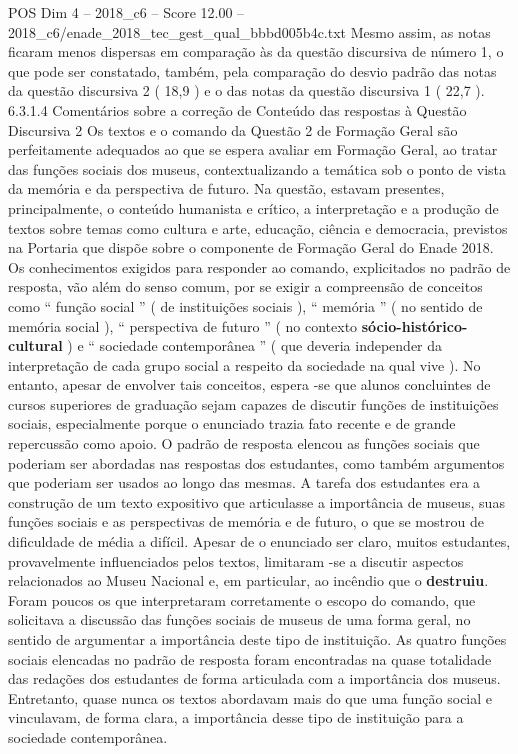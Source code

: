 \begin{textsample}{POS Dim 4 – 2018\_c6 – Score 12.00 – 2018\_c6/enade\_2018\_tec\_gest\_qual\_bbbd005b4c.txt}
Mesmo assim, as notas ficaram menos dispersas em comparação às da questão discursiva de número 1, o que pode ser constatado, também, pela comparação do desvio padrão das notas da questão discursiva 2 ( 18,9 ) e o das notas da questão discursiva 1 ( 22,7 ). 6.3.1.4 Comentários sobre a correção de Conteúdo das respostas à Questão Discursiva 2 Os textos e o comando da Questão 2 de Formação Geral são perfeitamente adequados ao que se espera avaliar em Formação Geral, ao tratar das funções sociais dos museus, contextualizando a temática sob o ponto de vista da memória e da perspectiva de futuro.
Na questão, estavam presentes, principalmente, o conteúdo humanista e crítico, a interpretação e a produção de textos sobre temas como cultura e arte, educação, ciência e democracia, previstos na Portaria que dispõe sobre o componente de Formação Geral do Enade 2018.
Os conhecimentos exigidos para responder ao comando, explicitados no padrão de resposta, vão além do senso comum, por se exigir a compreensão de conceitos como “ função social ” ( de instituições sociais ), “ memória ” ( no sentido de memória social ), “ perspectiva de futuro ” ( no contexto \textbf{sócio-histórico-cultural} ) e “ sociedade contemporânea ” ( que deveria independer da interpretação de cada grupo social a respeito da sociedade na qual vive ).
No entanto, apesar de envolver tais conceitos, espera -se que alunos concluintes de cursos superiores de graduação sejam capazes de discutir funções de instituições sociais, especialmente porque o enunciado trazia fato recente e de grande repercussão como apoio.
O padrão de resposta elencou as funções sociais que poderiam ser abordadas nas respostas dos estudantes, como também argumentos que poderiam ser usados ao longo das mesmas.
A tarefa dos estudantes era a construção de um texto expositivo que articulasse a importância de museus, suas funções sociais e as perspectivas de memória e de futuro, o que se mostrou de dificuldade de média a difícil.
Apesar de o enunciado ser claro, muitos estudantes, provavelmente influenciados pelos textos, limitaram -se a discutir aspectos relacionados ao Museu Nacional e, em particular, ao incêndio que o \textbf{destruiu}.
Foram poucos os que interpretaram corretamente o escopo do comando, que solicitava a discussão das funções sociais de museus de uma forma geral, no sentido de argumentar a importância deste tipo de instituição.
As quatro funções sociais elencadas no padrão de resposta foram encontradas na quase totalidade das redações dos estudantes de forma articulada com a importância dos museus.
Entretanto, quase nunca os textos abordavam mais do que uma função social e vinculavam, de forma clara, a importância desse tipo de instituição para a sociedade contemporânea.

\end{textsample}
